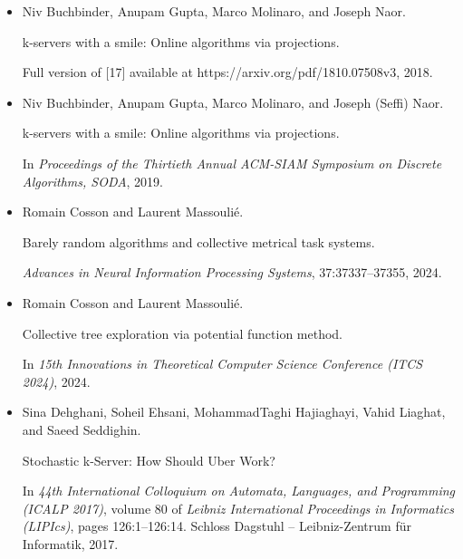 \begin{itemize}
\item[] 
[16]

Niv Buchbinder, Anupam Gupta, Marco Molinaro, and Joseph Naor.


k-servers with a smile: Online algorithms via projections.


Full version of [17] available at
https://arxiv.org/pdf/1810.07508v3, 2018.





\item[] 
[17]

Niv Buchbinder, Anupam Gupta, Marco Molinaro, and Joseph (Seffi) Naor.


k-servers with a smile: Online algorithms via projections.


In \emph{Proceedings of the Thirtieth Annual ACM-SIAM Symposium on
Discrete Algorithms, SODA}, 2019.





\item[] 
[18]

Romain Cosson and Laurent Massoulié.


Barely random algorithms and collective metrical task systems.


\emph{Advances in Neural Information Processing Systems},
37:37337–37355, 2024.





\item[] 
[19]

Romain Cosson and Laurent Massoulié.


Collective tree exploration via potential function method.


In \emph{15th Innovations in Theoretical Computer Science Conference
(ITCS 2024)}, 2024.





\item[] 
[20]

Sina Dehghani, Soheil Ehsani, MohammadTaghi Hajiaghayi, Vahid Liaghat, and
Saeed Seddighin.


Stochastic k-Server: How Should Uber Work?


In \emph{44th International Colloquium on Automata, Languages, and
Programming (ICALP 2017)}, volume 80 of \emph{Leibniz International
Proceedings in Informatics (LIPIcs)}, pages 126:1–126:14. Schloss Dagstuhl
– Leibniz-Zentrum für Informatik, 2017.



\end{itemize}

